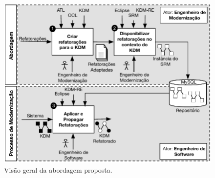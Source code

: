 

\begin{figure}[h]
	\centering
	\caption{Visão geral da abordagem proposta.}
	\label{fig:abordagem_kdm_tese_processo}
	\includegraphics[scale=0.8]{images/FiguraSinteseAbordagemIntoducao}
	\fautor
\end{figure}

